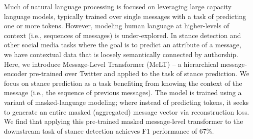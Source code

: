 Much of natural language processing is focused on leveraging large capacity language models, typically trained over single messages with a task of predicting one or more tokens. However, modeling human language at higher-levels of context (i.e., sequences of messages) is under-explored. In stance detection and other social media tasks where the goal is to predict an attribute of a message, we have contextual data that is loosely semantically connected by authorship. Here, we introduce Message-Level Transformer (MeLT) --  a hierarchical message-encoder pre-trained over Twitter and applied to the task of stance prediction. We focus on stance prediction as a task benefiting from knowing the context of the message (i.e., the sequence of previous messages). The model is trained using a variant of masked-language modeling; where instead of predicting tokens, it seeks to generate an entire masked (aggregated) message vector via reconstruction loss. We find that applying this pre-trained masked message-level transformer to the downstream task of stance detection achieves F1 performance of 67\%.
